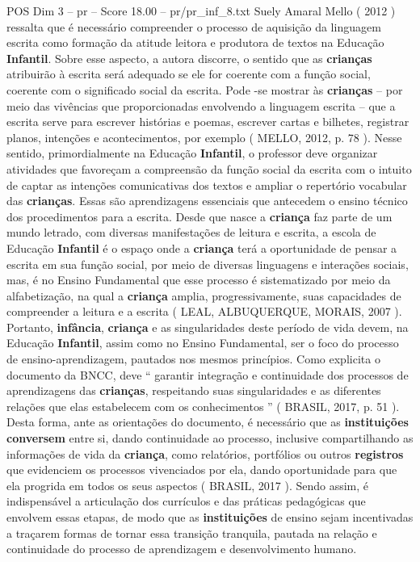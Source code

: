 \begin{textsample}{POS Dim 3 – pr – Score 18.00 – pr/pr\_inf\_8.txt}
Suely Amaral Mello ( 2012 ) ressalta que é necessário compreender o processo de aquisição da linguagem escrita como formação da atitude leitora e produtora de textos na Educação \textbf{Infantil}.
Sobre esse aspecto, a autora discorre, o sentido que as \textbf{crianças} atribuirão à escrita será adequado se ele for coerente com a função social, coerente com o significado social da escrita.
Pode -se mostrar às \textbf{crianças} – por meio das vivências que proporcionadas envolvendo a linguagem escrita – que a escrita serve para escrever histórias e poemas, escrever cartas e bilhetes, registrar planos, intenções e acontecimentos, por exemplo ( MELLO, 2012, p. 78 ).
Nesse sentido, primordialmente na Educação \textbf{Infantil}, o professor deve organizar atividades que favoreçam a compreensão da função social da escrita com o intuito de captar as intenções comunicativas dos textos e ampliar o repertório vocabular das \textbf{crianças}.
Essas são aprendizagens essenciais que antecedem o ensino técnico dos procedimentos para a escrita.
Desde que nasce a \textbf{criança} faz parte de um mundo letrado, com diversas manifestações de leitura e escrita, a escola de Educação \textbf{Infantil} é o espaço onde a \textbf{criança} terá a oportunidade de pensar a escrita em sua função social, por meio de diversas linguagens e interações sociais, mas, é no Ensino Fundamental que esse processo é sistematizado por meio da alfabetização, na qual a \textbf{criança} amplia, progressivamente, suas capacidades de compreender a leitura e a escrita ( LEAL, ALBUQUERQUE, MORAIS, 2007 ).
Portanto, \textbf{infância}, \textbf{criança} e as singularidades deste período de vida devem, na Educação \textbf{Infantil}, assim como no Ensino Fundamental, ser o foco do processo de ensino-aprendizagem, pautados nos mesmos princípios.
Como explicita o documento da BNCC, deve “ garantir integração e continuidade dos processos de aprendizagens das \textbf{crianças}, respeitando suas singularidades e as diferentes relações que elas estabelecem com os conhecimentos ” ( BRASIL, 2017, p. 51 ).
Desta forma, ante as orientações do documento, é necessário que as \textbf{instituições} \textbf{conversem} entre si, dando continuidade ao processo, inclusive compartilhando as informações de vida da \textbf{criança}, como relatórios, portfólios ou outros \textbf{registros} que evidenciem os processos vivenciados por ela, dando oportunidade para que ela progrida em todos os seus aspectos ( BRASIL, 2017 ).
Sendo assim, é indispensável a articulação dos currículos e das práticas pedagógicas que envolvem essas etapas, de modo que as \textbf{instituições} de ensino sejam incentivadas a traçarem formas de tornar essa transição tranquila, pautada na relação e continuidade do processo de aprendizagem e desenvolvimento humano.

\end{textsample}

